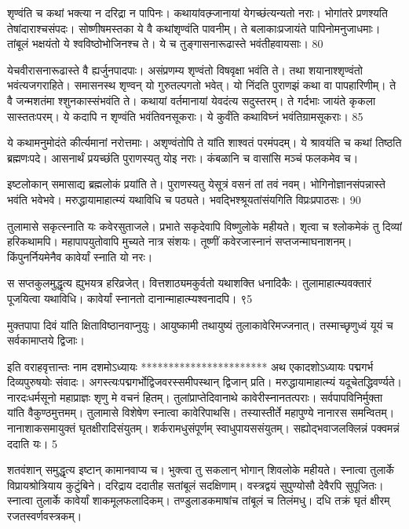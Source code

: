 शृण्वंति च कथां भक्त्या न दरिद्रा न पापिनः।
कथायांवत्म्र्जानायां येगच्छंत्यन्यतो नराः।
भोगांतरे प्रणश्यति तेषांदाराश्चसंपदः।
सोष्णीषमस्तका ये वै कथांशृण्वंति पावनीम्।
ते बलाकाःप्रजायंते पापिनोमनुजाधमाः।
तांबूलं भक्षयंतो ये श्वविष्ठोभोजिनश्च ते।
ये च तुङ्गासनारूढास्ते भवंतीहवायसाः।
80

येचवीरासनारूढास्ते वै ह्यर्जुनपादपाः।
असंप्रणम्य शृण्वंतो विषवृक्षा भवंति ते।
तथा शयानाश्शृण्वंतो भवंत्यजगराहिते।
समासनस्थ शृण्वन् यो गुरुतल्पगतो भवेत्।
यो निंदति पुराणझं कथा वा पापहारिणीम्।
ते वै जन्मशतंमा श्शुनकास्संभवंति ते।
कथायां वर्तमानायां येवदंत्य सदुस्तरम्।
ते गर्दभाः जायंते कृकला सास्ततःपरम्।
ये कदापि न शृण्वंति भवंतिवनसूकराः।
ये कुर्वंति कथाविघ्नं भवंतिग्रामसूकराः।
85

ये कथामनुमोदंते कीर्त्यमानां नरोत्तमाः।
अशृण्वंतोपि ते यांति शाश्वतं परमंपदम्।
ये श्रावयंति च कथां तिष्ठति ब्रह्मणःपदे।
आसनार्थं प्रयच्छंति पुराणस्यतु योइ नराः।
कंबळानि च वासांसि मञ्चं फलकमेव च।

इष्टलोकान् समासाद्य ब्रह्मलोकं प्रयांति ते।
पुराणस्यतु येसूत्रं वसनं तां तवं नवम्।
भोगिनोज्ञानसंपन्नास्ते भवंति भवेभवे।
मरुद्धायामाहात्म्यं यथाविधि च पठ्यते।
भवद्भिश्श्रूयतांसंयगिति विप्रःप्रपाठसः।
90

तुलामासे सकृत्स्नाति यः कवेरसुताजले।
प्रभाते सकृदेवापि विष्णुलोके महीयते।
शृत्वा च श्लोकमेकं तु दिव्यां हरिकथामपि।
महापापयुतोवापि मुच्यते नात्र संशयः।
तूष्णीं कवेरजास्नानं सप्तजन्माघनाशनम्।
किंपुनर्नियमेनैव कावेर्यां स्नाति यो नरः।

स सप्तकुलमुद्धृत्य ह्युभयत्र हरिव्रजेत्।
वित्तशाठ्यमकुर्वतो यथाशक्ति धनादिकैः।
तुलामाहात्म्यवक्तारं पूजयित्वा यथाविधि।
कावेर्यां स्नानतो दानान्माहात्म्यश्वनादपि।
९5

मुक्तपापा दिवं यांति क्षिताविष्ठानवाप्नुयुः।
आयुष्कामी तथायुष्यं तुलाकावेरिमज्जनात्।
तस्माच्छृणुध्वं यूयं च सर्वकामाप्तये द्विजाः।

इति वराहवृत्तान्तः नाम दशमोऽध्यायः
***********************
अथ एकादशोऽध्यायः
पद्मगर्भ दिव्यपुरुषयोः संवादः।
अगस्त्यःपद्मगर्भोद्विजवरस्समीपस्थान् द्विजान् प्रति।
मरुद्धायामाहात्म्यं यदूचेतद्धिवर्ण्यते।
नारदःधर्मसूनो महाप्राज्ञः शृणु मे वचनं हितम्।
तुलांप्राप्तेदिवानाथे कावेरीस्नानतत्पराः।
सर्वपापविनिर्मुक्ता यांति वैकुण्ठमुत्तमम्।
तुलामासे विशेषेण स्नात्वा कावेरिपाथसि।
तस्यास्तीर्ते महापुण्ये नानारस समन्वितम्।
नानाशाकसमायुक्तं घृतक्षीरादिसंयुतम्।
शर्करामधुसंपूर्णम् स्वाधुपायससंयुतम्।
सह्योद्भवाजलक्लिन्नं पक्वमन्नं ददाति यः।
5

शतवंशान् समुद्धृत्य इष्टान् कामानवाप्य च।
भुक्त्वा तु सकलान् भोगान् शिवलोके महीयते।
स्नात्वा तुलार्के विप्रायश्रोत्रियाय कुटुंबिने।
दरिद्राय ददातीह सतांबूलं सदक्षिणाम्।
वस्त्रद्वयं सुपुण्योसौ देवैरपि सुपूजितः।
स्नात्वा तुलार्के कावेर्यां शाकमूलफलादिकम्।
तण्डुलाडकमाषांच तांबूलं च तिलंमधु।
दधि तक्रं घृतं क्षीरम् रजतस्वर्णवस्त्रकम्।


